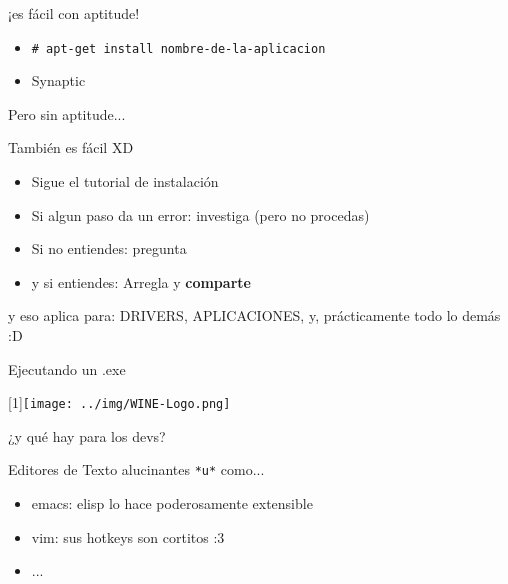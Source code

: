 \documentclass[xcolor=dvipsnames, pdf]{beamer}
\begin{document}
\begin{section}
\begin{subsection}
    \begin{frame}
      {¡es fácil con aptitude!}
      
      \begin{itemize}
      \item \texttt{\#{} apt-get install nombre-de-la-aplicacion}
      \item Synaptic
      \end{itemize}
    \end{frame}
    
    \begin{frame}
      {Pero sin aptitude...}
      
      También es fácil XD
      
      \begin{itemize}
      \item Sigue el tutorial de instalación
      \item Si algun paso da un error: investiga \alert{(pero no procedas)}
      \item Si no entiendes: pregunta
      \item y si entiendes: Arregla y \textbf{comparte}
      \end{itemize}
      \pause
      y eso aplica para: \color[rgb]{0.8,0.3,0.3} DRIVERS,
      \color[rgb]{0.3,0.8,0.3} APLICACIONES, 
      \color[rgb]{0.3,0.3,0.8} y, prácticamente todo lo demás :D
    \end{frame}
    
    \begin{frame}
      {Ejecutando un .exe}
      \begin{center}
        \scalebox{-1}[1]{\texttt{[image: ../img/WINE-Logo.png]}}
      \end{center}
    \end{frame}
  \end{subsection}
  
  \begin{subsection}
    {¿y qué hay para los devs?}
    
    \begin{frame}
      {Editores de Texto alucinantes \texttt{*u*}}
      como...
      \begin{itemize}
      \item emacs: elisp lo hace poderosamente extensible
      \item vim: sus hotkeys son cortitos :3 
      \item ...
      \end{itemize}
    \end{frame}
    

\end{subsection}
\end{section}
\end{document}
